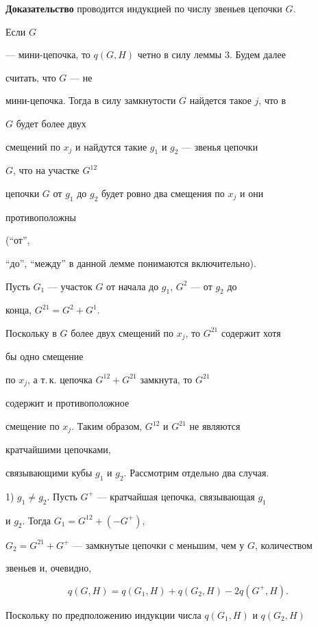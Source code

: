  


{\bf Доказательство} проводится индукцией по числу звеньев цепочки $G$. 


Если $G$ 


--- мини-цепочка, то $q(G,H)$ четно в силу леммы 3. Будем далее 


считать, что $G$ --- не 


мини-цепочка. Тогда в силу замкнутости $G$ найдется такое $j$, что в 


$G$ будет более двух 


смещений по $x_j$ и найдутся такие $g_1$ и $g_2$ --- звенья цепочки 


$G$, что на участке $G^{12}$ 


цепочки $G$ от $g_1$ до $g_2$ будет ровно два смещения по $x_j$ и они 


противоположны 


(``от'', 


``до'', ``между'' в данной лемме понимаются включительно). 


 


Пусть $G_1$ --- участок $G$ от начала до $g_1$, $G^2$ --- от $g_2$ до 


конца, $G^{21}=G^2+G^1$. 


Поскольку в $G$ более двух смещений по $x_j$, то $G^{21}$ содержит хотя 


бы одно смещение 


по $x_j$, а т.\,к. цепочка $G^{12}+G^{21}$ замкнута, то $G^{21}$ 


содержит и противоположное 


смещение по $x_j$. Таким образом, $G^{12}$ и $G^{21}$ не являются 


кратчайшими цепочками, 


связывающими кубы $g_1$ и $g_2$. Рассмотрим отдельно два случая. 


 


1) $g_1\ne g_2$. Пусть $G^+$ --- кратчайшая цепочка, связывающая $g_1$ 


и $g_2$. Тогда $G_1=G^{12}+(-G^+)$, 


$G_2=G^{21}+G^+$ --- замкнутые цепочки с меньшим, чем у $G$, количеством 


звеньев и, очевидно, 


$$ 


q(G,H)=q(G_1,H)+q(G_2,H)-2q(G^+,H). 


$$ 


Поскольку по предположению индукции числа $q(G_1,H)$ и $q(G_2,H)$ 


